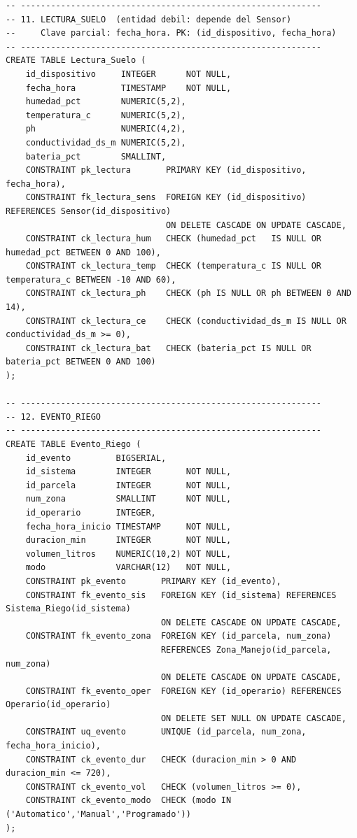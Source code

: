 \documentclass[11pt,letterpaper]{article}
\begin{document}
\begin{lstlisting}[style=sql, title={01\_ddl.sql}]
-- ------------------------------------------------------------
-- 11. LECTURA_SUELO  (entidad debil: depende del Sensor)
--     Clave parcial: fecha_hora. PK: (id_dispositivo, fecha_hora)
-- ------------------------------------------------------------
CREATE TABLE Lectura_Suelo (
    id_dispositivo     INTEGER      NOT NULL,
    fecha_hora         TIMESTAMP    NOT NULL,
    humedad_pct        NUMERIC(5,2),
    temperatura_c      NUMERIC(5,2),
    ph                 NUMERIC(4,2),
    conductividad_ds_m NUMERIC(5,2),
    bateria_pct        SMALLINT,
    CONSTRAINT pk_lectura       PRIMARY KEY (id_dispositivo, fecha_hora),
    CONSTRAINT fk_lectura_sens  FOREIGN KEY (id_dispositivo) REFERENCES Sensor(id_dispositivo)
                                ON DELETE CASCADE ON UPDATE CASCADE,
    CONSTRAINT ck_lectura_hum   CHECK (humedad_pct   IS NULL OR humedad_pct BETWEEN 0 AND 100),
    CONSTRAINT ck_lectura_temp  CHECK (temperatura_c IS NULL OR temperatura_c BETWEEN -10 AND 60),
    CONSTRAINT ck_lectura_ph    CHECK (ph IS NULL OR ph BETWEEN 0 AND 14),
    CONSTRAINT ck_lectura_ce    CHECK (conductividad_ds_m IS NULL OR conductividad_ds_m >= 0),
    CONSTRAINT ck_lectura_bat   CHECK (bateria_pct IS NULL OR bateria_pct BETWEEN 0 AND 100)
);

-- ------------------------------------------------------------
-- 12. EVENTO_RIEGO
-- ------------------------------------------------------------
CREATE TABLE Evento_Riego (
    id_evento         BIGSERIAL,
    id_sistema        INTEGER       NOT NULL,
    id_parcela        INTEGER       NOT NULL,
    num_zona          SMALLINT      NOT NULL,
    id_operario       INTEGER,
    fecha_hora_inicio TIMESTAMP     NOT NULL,
    duracion_min      INTEGER       NOT NULL,
    volumen_litros    NUMERIC(10,2) NOT NULL,
    modo              VARCHAR(12)   NOT NULL,
    CONSTRAINT pk_evento       PRIMARY KEY (id_evento),
    CONSTRAINT fk_evento_sis   FOREIGN KEY (id_sistema) REFERENCES Sistema_Riego(id_sistema)
                               ON DELETE CASCADE ON UPDATE CASCADE,
    CONSTRAINT fk_evento_zona  FOREIGN KEY (id_parcela, num_zona)
                               REFERENCES Zona_Manejo(id_parcela, num_zona)
                               ON DELETE CASCADE ON UPDATE CASCADE,
    CONSTRAINT fk_evento_oper  FOREIGN KEY (id_operario) REFERENCES Operario(id_operario)
                               ON DELETE SET NULL ON UPDATE CASCADE,
    CONSTRAINT uq_evento       UNIQUE (id_parcela, num_zona, fecha_hora_inicio),
    CONSTRAINT ck_evento_dur   CHECK (duracion_min > 0 AND duracion_min <= 720),
    CONSTRAINT ck_evento_vol   CHECK (volumen_litros >= 0),
    CONSTRAINT ck_evento_modo  CHECK (modo IN ('Automatico','Manual','Programado'))
);


\end{lstlisting}
\end{document}
